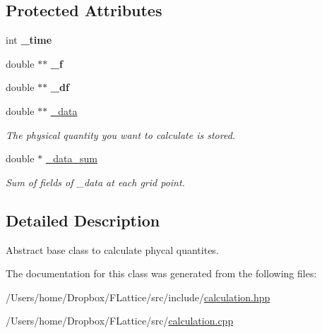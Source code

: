\subsection*{Protected Attributes}
\begin{DoxyCompactItemize}
\item 
\mbox{\label{class_calculate_base_a759eb201d41d35ea600333074e007181}} 
int {\bfseries \+\_\+time}
\item 
\mbox{\label{class_calculate_base_a5e863d6582d9a59270fa382552a86de0}} 
double $\ast$$\ast$ {\bfseries \+\_\+f}
\item 
\mbox{\label{class_calculate_base_a7b88550952b5b159369a0446e0278b1b}} 
double $\ast$$\ast$ {\bfseries \+\_\+df}
\item 
\mbox{\label{class_calculate_base_ae77ed832e35fb46ae64baec24a9ff359}} 
double $\ast$$\ast$ \mbox{\hyperlink{class_calculate_base_ae77ed832e35fb46ae64baec24a9ff359}{\+\_\+data}}
\begin{DoxyCompactList}\small\item\em The physical quantity you want to calculate is stored. \end{DoxyCompactList}\item 
\mbox{\label{class_calculate_base_a5481e38a3cf7122365f57bda92d3e27a}} 
double $\ast$ \mbox{\hyperlink{class_calculate_base_a5481e38a3cf7122365f57bda92d3e27a}{\+\_\+data\+\_\+sum}}
\begin{DoxyCompactList}\small\item\em Sum of fields of \+\_\+data at each grid point. \end{DoxyCompactList}\end{DoxyCompactItemize}


\subsection{Detailed Description}
Abstract base class to calculate phycal quantites. 

The documentation for this class was generated from the following files\+:\begin{DoxyCompactItemize}
\item 
/\+Users/home/\+Dropbox/\+F\+Lattice/src/include/\mbox{\hyperlink{calculation_8hpp}{calculation.\+hpp}}\item 
/\+Users/home/\+Dropbox/\+F\+Lattice/src/\mbox{\hyperlink{calculation_8cpp}{calculation.\+cpp}}\end{DoxyCompactItemize}
